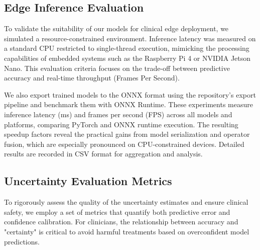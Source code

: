 \documentclass[conference]{IEEEtran}
\begin{document}
\subsection{Edge Inference Evaluation}
To validate the suitability of our models for clinical edge deployment, we simulated a resource-constrained environment. Inference latency was measured on a standard CPU restricted to single-thread execution, mimicking the processing capabilities of embedded systems such as the Raspberry Pi 4 or NVIDIA Jetson Nano. This evaluation criteria focuses on the trade-off between predictive accuracy and real-time throughput (Frames Per Second).

We also export trained models to the ONNX format using the repository's export pipeline and benchmark them with ONNX Runtime. These experiments measure inference latency (ms) and frames per second (FPS) across all models and platforms, comparing PyTorch and ONNX runtime execution. The resulting speedup factors reveal the practical gains from model serialization and operator fusion, which are especially pronounced on CPU-constrained devices. Detailed results are recorded in CSV format for aggregation and analysis.

\subsection{Uncertainty Evaluation Metrics}
To rigorously assess the quality of the uncertainty estimates and ensure clinical safety, we employ a set of metrics that quantify both predictive error and confidence calibration. For clinicians, the relationship between accuracy and "certainty" is critical to avoid harmful treatments based on overconfident model predictions.
\end{document}
